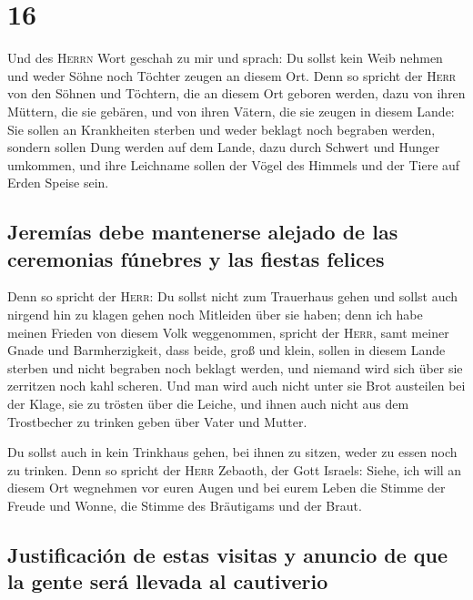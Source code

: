 \hypertarget{section-15}{%
\section{16}\label{section-15}}

 Und des \textsc{Herrn} Wort geschah zu mir und sprach:
 Du sollst kein Weib nehmen und weder Söhne noch Töchter
zeugen an diesem Ort.  Denn so spricht der \textsc{Herr}
von den Söhnen und Töchtern, die an diesem Ort geboren werden, dazu von
ihren Müttern, die sie gebären, und von ihren Vätern, die sie zeugen in
diesem Lande:  Sie sollen an Krankheiten sterben und weder
beklagt noch begraben werden, sondern sollen Dung werden auf dem Lande,
dazu durch Schwert und Hunger umkommen, und ihre Leichname sollen der
Vögel des Himmels und der Tiere auf Erden Speise sein.

\hypertarget{jeremuxedas-debe-mantenerse-alejado-de-las-ceremonias-fuxfanebres-y-las-fiestas-felices}{%
\subsection{Jeremías debe mantenerse alejado de las ceremonias fúnebres
y las fiestas
felices}\label{jeremuxedas-debe-mantenerse-alejado-de-las-ceremonias-fuxfanebres-y-las-fiestas-felices}}

 Denn so spricht der \textsc{Herr}: Du sollst nicht zum
Trauerhaus gehen und sollst auch nirgend hin zu klagen gehen noch
Mitleiden über sie haben; denn ich habe meinen Frieden von diesem Volk
weggenommen, spricht der \textsc{Herr}, samt meiner Gnade und
Barmherzigkeit,  dass beide, groß und klein, sollen in
diesem Lande sterben und nicht begraben noch beklagt werden, und niemand
wird sich über sie zerritzen noch kahl scheren.  Und man
wird auch nicht unter sie Brot austeilen bei der Klage, sie zu trösten
über die Leiche, und ihnen auch nicht aus dem Trostbecher zu trinken
geben über Vater und Mutter.

 Du sollst auch in kein Trinkhaus gehen, bei ihnen zu
sitzen, weder zu essen noch zu trinken.  Denn so spricht
der \textsc{Herr} Zebaoth, der Gott Israels: Siehe, ich will an diesem
Ort wegnehmen vor euren Augen und bei eurem Leben die Stimme der Freude
und Wonne, die Stimme des Bräutigams und der Braut.

\hypertarget{justificaciuxf3n-de-estas-visitas-y-anuncio-de-que-la-gente-seruxe1-llevada-al-cautiverio}{%
\subsection{Justificación de estas visitas y anuncio de que la gente
será llevada al
cautiverio}\label{justificaciuxf3n-de-estas-visitas-y-anuncio-de-que-la-gente-seruxe1-llevada-al-cautiverio}}

